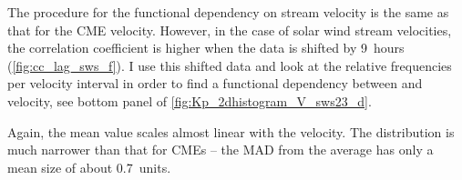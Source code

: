 The procedure for the functional dependency on stream velocity is the same as that for the CME velocity. However, in the case of solar wind stream velocities, the correlation coefficient is higher when the data is shifted by 9~hours (\autoref{fig:cc_lag_sws_f}).
I use this shifted data and look at the relative frequencies per velocity interval in order to find a functional dependency between \Kp{} and velocity, see bottom panel of \autoref{fig:Kp_2dhistogram_V_sws23_d}.
\begin{figure}
\end{figure}
Again, the mean \Kp{} value scales almost linear with the velocity. The distribution is much narrower than that for CMEs -- the MAD from the average \Kp{} has only a mean size of about \SI{0.7}{\Kp}~units.

